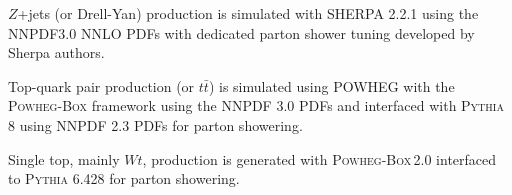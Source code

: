 
$Z$+jets (or Drell-Yan) production is simulated with \textsc{SHERPA} 2.2.1 using the NNPDF3.0 NNLO PDFs with dedicated parton shower tuning developed by Sherpa authors. 

Top-quark pair production (or $t\bar{t}$) is simulated using \textsc{POWHEG} with the \textsc{ Powheg-Box} framework using the NNPDF 3.0 PDFs and interfaced with \textsc{Pythia 8} using NNPDF 2.3 PDFs for parton showering. %

Single top, mainly $Wt$, production is generated with \textsc{Powheg-Box}\,2.0 interfaced to \textsc{Pythia} 6.428 for parton showering.

